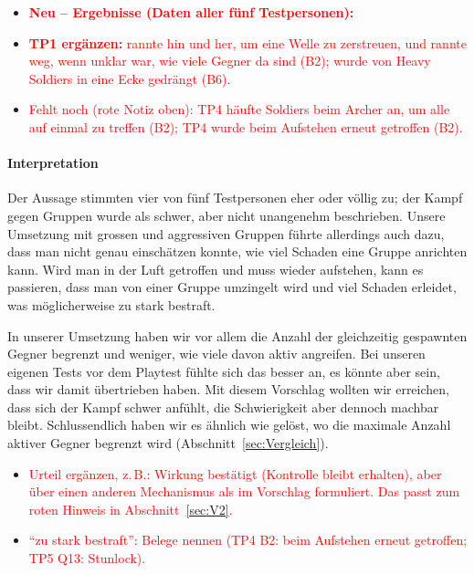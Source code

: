 \documentclass[../Main.tex]{subfiles}
\begin{document}
\begin{itemize}[leftmargin=1.5cm]
    \item \textcolor{red}{\textbf{Neu -- Ergebnisse (Daten aller fünf Testpersonen):}}
    \item \textcolor{red}{\textbf{TP1 ergänzen:} rannte hin und her, um eine Welle zu zerstreuen, und rannte weg, wenn unklar war, wie viele Gegner da sind (B2); wurde von Heavy Soldiers in eine Ecke gedrängt (B6).}
    \item \textcolor{red}{Fehlt noch (rote Notiz oben): TP4 häufte Soldiers beim Archer an, um alle auf einmal zu treffen (B2); TP4 wurde beim Aufstehen erneut getroffen (B2).}
\end{itemize}

\paragraph{Interpretation}
Der Aussage stimmten vier von fünf Testpersonen eher oder völlig zu; der Kampf gegen Gruppen wurde als schwer, aber nicht unangenehm beschrieben. Unsere Umsetzung mit grossen und aggressiven Gruppen führte allerdings auch dazu, dass man nicht genau einschätzen konnte, wie viel Schaden eine Gruppe anrichten kann. Wird man in der Luft getroffen und muss wieder aufstehen, kann es passieren, dass man von einer Gruppe umzingelt wird und viel Schaden erleidet, was möglicherweise zu stark bestraft.

In unserer Umsetzung haben wir vor allem die Anzahl der gleichzeitig gespawnten Gegner begrenzt und weniger, wie viele davon aktiv angreifen. Bei unseren eigenen Tests vor dem Playtest fühlte sich das besser an, es könnte aber sein, dass wir damit übertrieben haben. Mit diesem Vorschlag wollten wir erreichen, dass sich der Kampf schwer anfühlt, die Schwierigkeit aber dennoch machbar bleibt. Schlussendlich haben wir es ähnlich wie  gelöst, wo die maximale Anzahl aktiver Gegner begrenzt wird (Abschnitt~\ref{sec:Vergleich}).

\begin{itemize}[leftmargin=1.5cm]
    \item \textcolor{red}{Urteil ergänzen, z.\,B.: Wirkung bestätigt (Kontrolle bleibt erhalten), aber über einen anderen Mechanismus als im Vorschlag formuliert. Das passt zum roten Hinweis in Abschnitt~\ref{sec:V2}.}
    \item \textcolor{red}{\enquote{zu stark bestraft}: Belege nennen (TP4 B2: beim Aufstehen erneut getroffen; TP5 Q13: Stunlock).}
\end{itemize}
\end{document}

